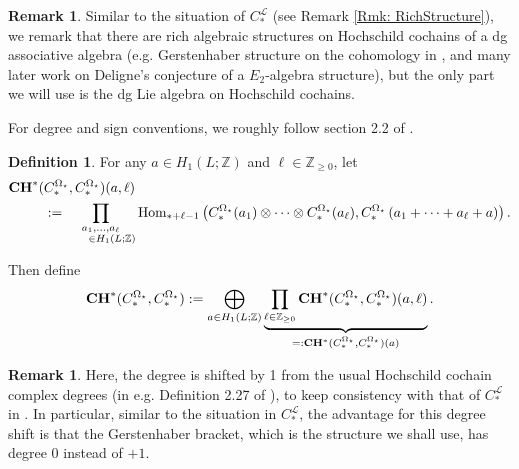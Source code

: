 \documentclass[10pt]{amsart}
\numberwithin{equation}{section}
\theoremstyle{plain}
\theoremstyle{definition}
\newtheorem{definition}[theorem]{Definition}
\newtheorem{remark}[theorem]{Remark}
\theoremstyle{remark}
\numberwithin{equation}{section}
\newcommand{\Z}{\mathbb{Z}}
\newcommand{\Hom}{\textup{Hom}}
\newcommand{\CC}{\textbf{\textup{CH}}}
\newcommand{\CFr}{C_*^\mathscr{L}}
\newcommand{\CBa}{C_*^{\Omega_\star}}
\begin{document}
{\begin{remark}\label{Rmk: RichStructure2}
Similar to the situation of $\CFr$ (see Remark \ref{Rmk: RichStructure}), we remark that there are rich algebraic structures on Hochschild cochains of a dg associative algebra (e.g. Gerstenhaber structure on the cohomology in \cite{Gerstenhaber}, and many later work on Deligne's conjecture of a $E_2$-algebra structure), but the only part we will use is the dg Lie algebra on Hochschild cochains.
\end{remark}



For degree and sign conventions, we roughly follow section 2.2 of \cite{Irie1}.

\begin{definition}\label{Defn: HochschildCochains}
	For any $a\in H_1(L;\Z)$ and $\ell\in \Z_{\geq 0}$, let 
	\begin{align*}
			\CC^*(&\CBa,\CBa)(a,\ell)\\&:= \prod_{\substack{a_1,\dots, a_\ell\\ \,\,\,\,\,\,\,\,\,\,\,\, \in H_1(L;\Z)}}\Hom_{*+\ell - 1} \left( \CBa(a_1)\otimes \dots \otimes \CBa(a_\ell), \CBa\left(a_1+\dots + a_\ell+a\right)\right).
	\end{align*}
	
	Then define \[ \CC^*(\CBa,\CBa):= \bigoplus_{a\in H_1(L;\Z)} \underbrace{\prod_{\ell\in \Z_{\geq 0}} \CC^*(\CBa,\CBa)(a,\ell)}_{=:\CC^*(\CBa,\CBa)(a)}. \]	
\end{definition}




\begin{remark}
	Here, the degree is shifted by 1 from the usual Hochschild cochain complex degrees (in e.g. Definition 2.27 of \cite{GanatraThesis}), to keep consistency with that of $\CFr$ in \cite{Irie1,Irie2}. In particular, similar to the situation in $\CFr$, the advantage for this degree shift is that the Gerstenhaber bracket, which is the structure we shall use, has degree 0 instead of $+1$.
\end{remark}

}
\end{document}
